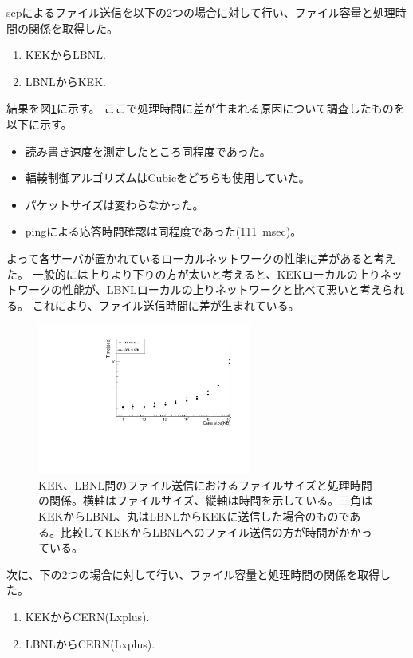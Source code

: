 scpによるファイル送信を以下の2つの場合に対して行い、ファイル容量と処理時間の関係を取得した。

\begin{enumerate}
  \item KEKからLBNL.
  \item LBNLからKEK.
\end{enumerate}

結果を図\ref{datasize_vs_time_kek_lbl}に示す。
ここで処理時間に差が生まれる原因について調査したものを以下に示す。
\begin{itemize}
  \item 読み書き速度を測定したところ同程度であった。
  \item 輻輳制御アルゴリズムはCubicをどちらも使用していた。
  \item パケットサイズは変わらなかった。
  \item pingによる応答時間確認は同程度であった(111~msec)。
\end{itemize}

よって各サーバが置かれているローカルネットワークの性能に差があると考えた。
一般的には上りより下りの方が太いと考えると、KEKローカルの上りネットワークの性能が、LBNLローカルの上りネットワークと比べて悪いと考えられる。
これにより、ファイル送信時間に差が生まれている。

\begin{figure}[bpt]\centering
  \begin{center}
    \includegraphics[width=7cm,angle=270]{./scp_kek_lbl.pdf}
  \caption[KEK、LBNL間のファイル送信]{KEK、LBNL間のファイル送信におけるファイルサイズと処理時間の関係。横軸はファイルサイズ、縦軸は時間を示している。三角はKEKからLBNL、丸はLBNLからKEKに送信した場合のものである。比較してKEKからLBNLへのファイル送信の方が時間がかかっている。}
  \label{datasize_vs_time_kek_lbl}
  \end{center}
\end{figure}

次に、下の2つの場合に対して行い、ファイル容量と処理時間の関係を取得した。
\begin{enumerate}
  \item KEKからCERN(Lxplus).
  \item LBNLからCERN(Lxplus).
\end{enumerate}

